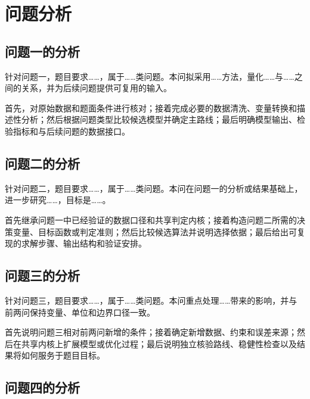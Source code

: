 
\section{问题分析}

\subsection{问题一的分析}

针对问题一，题目要求……，属于……类问题。本问拟采用……方法，量化……与……之间的关系，并为后续问题提供可复用的输入。

首先，对原始数据和题面条件进行核对；接着完成必要的数据清洗、变量转换和描述性分析；然后根据问题类型比较候选模型并确定主路线；最后明确模型输出、检验指标和与后续问题的数据接口。

\subsection{问题二的分析}

针对问题二，题目要求……，属于……类问题。本问在问题一的分析或结果基础上，进一步研究……，目标是……。

首先继承问题一中已经验证的数据口径和共享判定内核；接着构造问题二所需的决策变量、目标函数或判定准则；然后比较候选算法并说明选择依据；最后给出可复现的求解步骤、输出结构和验证安排。

\subsection{问题三的分析}

针对问题三，题目要求……，属于……类问题。本问重点处理……带来的影响，并与前两问保持变量、单位和边界口径一致。

首先说明问题三相对前两问新增的条件；接着确定新增数据、约束和误差来源；然后在共享内核上扩展模型或优化过程；最后说明独立核验路线、稳健性检查以及结果将如何服务于题目目标。

\subsection{问题四的分析}

